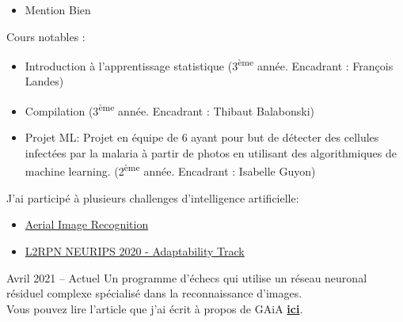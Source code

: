 \documentclass[10pt,a4paper,ragged2e,withhyper]{altacv}
\begin{document}
\begin{paracol}{2}
            \begin{itemize}
                \item Mention Bien
            \end{itemize}

            Cours notables :
            \vspace{2pt}
            \begin{itemize}
                \item Introduction à l'apprentissage statistique (3\textsuperscript{ème} année. Encadrant : François Landes)
                \item Compilation (3\textsuperscript{ème} année. Encadrant : Thibaut Balabonski)
                \item Projet ML: Projet en équipe de 6 ayant pour but de détecter des cellules infectées par la malaria à partir de photos
                      en utilisant des algorithmiques de machine learning.
                      (2\textsuperscript{ème} année. Encadrant : Isabelle Guyon)
            \end{itemize}
            

        \pagebreak
          J'ai participé à plusieurs challenges d'intelligence artificielle:
          \begin{itemize}
            \item \href{https://codalab.lisn.upsaclay.fr/competitions/573}{Aerial Image Recognition}
            \item \href{https://competitions.codalab.org/competitions/25427}{L2RPN NEURIPS 2020 - Adaptability Track}
          \end{itemize}

            {Avril 2021 -- Actuel}{}
            Un programme d'échecs qui utilise un réseau neuronal résiduel complexe spécialisé dans la reconnaissance d'images.\\
            Vous pouvez lire l'article que j'ai écrit à propos de GAiA
            \href{https://raw.githubusercontent.com/Plagiat01/GAiA/master/article/Performing%20Regression%20on%20Complex%20Data.pdf}
            {\textbf{ici}}.\\
            \vspace{4pt}
            \\
            \vspace{4pt}
            \divider


\end{paracol}
\end{document}

